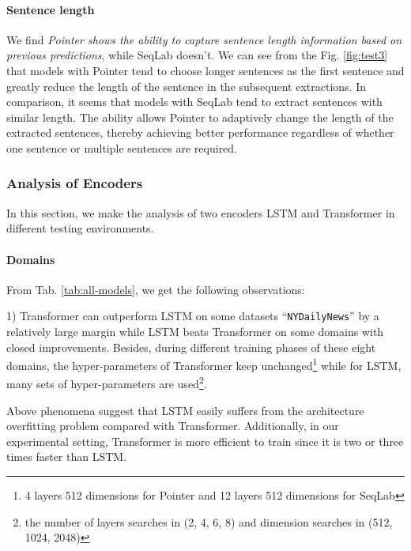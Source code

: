 \documentclass[11pt,a4paper]{article}
\begin{document}
\paragraph{Sentence length} We find \textit{Pointer shows the ability to capture sentence length information based on previous predictions}, while SeqLab doesn't. We can see from the Fig. \ref{fig:test3} that models with Pointer tend to choose longer sentences as the first sentence and greatly reduce the length of the sentence in the subsequent extractions. In comparison, it seems that models with SeqLab tend to extract sentences with similar length.
The ability allows Pointer to adaptively change the length of the extracted sentences, thereby achieving better performance regardless of whether one sentence or multiple sentences are required.



















\subsubsection{Analysis of Encoders} \label{eq:ecoder}
In this section, we make the analysis of two encoders LSTM and Transformer in different testing environments.

\paragraph{Domains}
From Tab. \ref{tab:all-models}, we get the following observations:

1)  Transformer can outperform LSTM on some datasets ``\texttt{NYDailyNews}'' by a relatively large margin while LSTM beats Transformer on some domains with closed improvements.
Besides, during different training phases of these eight domains, the hyper-parameters of Transformer keep unchanged\footnote{4 layers 512 dimensions for Pointer and 12 layers 512 dimensions for SeqLab} while for LSTM, many sets of hyper-parameters are used\footnote{the number of layers searches in (2, 4, 6, 8) and dimension searches in (512, 1024, 2048)}.


Above phenomena suggest that LSTM easily suffers from the architecture overfitting problem compared with Transformer.
Additionally, in our experimental setting, Transformer is more efficient to train since it is two or three times faster than LSTM.
\end{document}
